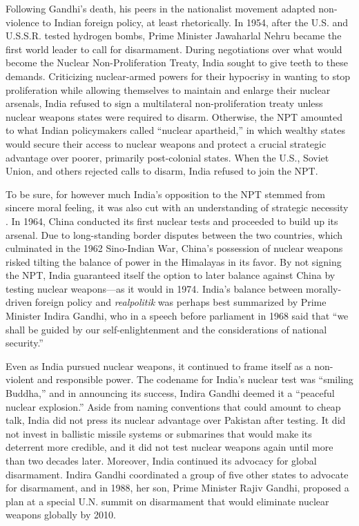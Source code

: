 \documentclass[12pt]{article}
\begin{document}
Following Gandhi's death, his peers in the nationalist movement adapted non-violence to Indian foreign policy, at least rhetorically. In 1954, after the U.S. and U.S.S.R. tested hydrogen bombs, Prime Minister Jawaharlal Nehru became the first world leader to call for disarmament. During negotiations over what would become the Nuclear Non-Proliferation Treaty, India sought to give teeth to these demands. Criticizing nuclear-armed powers for their hypocrisy in wanting to stop proliferation while allowing themselves to maintain and enlarge their nuclear arsenals, India refused to sign a multilateral non-proliferation treaty unless nuclear weapons states were required to disarm. Otherwise, the NPT amounted to what Indian policymakers called “nuclear apartheid,” in which wealthy states would secure their access to nuclear weapons and protect a crucial strategic advantage over poorer, primarily post-colonial states. When the U.S., Soviet Union, and others rejected calls to disarm, India refused to join the NPT.

To be sure, for however much India's opposition to the NPT stemmed from sincere moral feeling, it was also cut with an understanding of strategic necessity \citep{perkovich_indias_2001}. In 1964, China conducted its first nuclear tests and proceeded to build up its arsenal. Due to long-standing border disputes between the two countries, which culminated in the 1962 Sino-Indian War, China's possession of nuclear weapons risked tilting the balance of power in the Himalayas in its favor. By not signing the NPT, India guaranteed itself the option to later balance against China by testing nuclear weapons—as it would in 1974. India's balance between morally-driven foreign policy and \textit{realpolitik} was perhaps best summarized by Prime Minister Indira Gandhi, who in a speech before parliament in 1968 said that “we shall be guided by our self-enlightenment and the considerations of national security.”

Even as India pursued nuclear weapons, it continued to frame itself as a non-violent and responsible power. The codename for India's nuclear test was “smiling Buddha,” and in announcing its success, Indira Gandhi deemed it a “peaceful nuclear explosion.” Aside from naming conventions that could amount to cheap talk, India did not press its nuclear advantage over Pakistan after testing. It did not invest in ballistic missile systems or submarines that would make its deterrent more credible, and it did not test nuclear weapons again until more than two decades later. Moreover, India continued its advocacy for global disarmament. Indira Gandhi coordinated a group of five other states to advocate for disarmament, and in 1988, her son, Prime Minister Rajiv Gandhi, proposed a plan at a special U.N. summit on disarmament that would eliminate nuclear weapons globally by 2010. 
\end{document}
